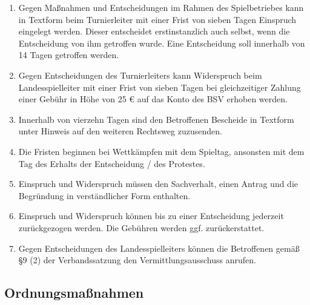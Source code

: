 \documentclass[fontsize=12pt, paper=a4, ngerman]{article}
\begin{document}
\begin{enumerate}
\item Gegen Maßnahmen und Entscheidungen im Rahmen des Spielbetriebes kann in Textform beim Turnierleiter mit einer Frist von sieben Tagen Einspruch eingelegt werden.
Dieser entscheidet erstinstanzlich auch selbst, wenn die Entscheidung von ihm getroffen wurde. Eine Entscheidung soll innerhalb von 14 Tagen getroffen werden.
\item Gegen Entscheidungen des Turnierleiters kann Widerspruch beim Landesspielleiter mit einer Frist von sieben Tagen bei gleichzeitiger Zahlung einer Gebühr
in Höhe von 25 € auf das Konto des BSV erhoben werden.
\item Innerhalb von vierzehn Tagen sind den Betroffenen Bescheide in Textform unter Hinweis auf den weiteren Rechtsweg zuzusenden.
\item Die Fristen beginnen bei Wettkämpfen mit dem Spieltag, ansonsten mit dem Tag des Erhalts der Entscheidung / des Protestes.
\item Einspruch und Widerspruch müssen den Sachverhalt, einen Antrag und die Begründung in verständlicher Form enthalten.
\item Einspruch und Widerspruch können bis zu einer Entscheidung jederzeit zurückgezogen werden. Die Gebühren werden ggf. zurückerstattet.
\item Gegen Entscheidungen des Landesspielleiters können die Betroffenen gemäß §9 (2) der Verbandssatzung den Vermittlungsausschuss anrufen.
\end{enumerate}

\subsection{Ordnungsmaßnahmen}
\end{document}
